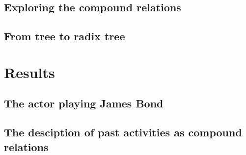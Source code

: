 \subsection{Exploring the compound relations}

\subsection{From tree to radix tree}


\section{Results}

\subsection{The actor playing James Bond}

\subsection{The desciption of past activities as compound relations}